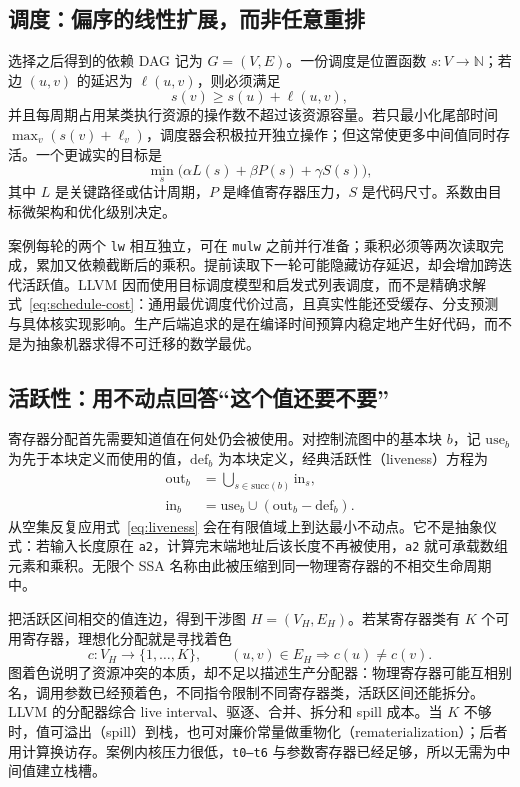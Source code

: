 \subsection{调度：偏序的线性扩展，而非任意重排}

选择之后得到的依赖 DAG 记为 $G=(V,E)$。一份调度是位置函数 $s:V\to\mathbb{N}$；若边 $(u,v)$ 的延迟为 $\ell(u,v)$，则必须满足
\begin{equation}
  s(v)\ge s(u)+\ell(u,v),
  \label{eq:schedule-dep}
\end{equation}
并且每周期占用某类执行资源的操作数不超过该资源容量。若只最小化尾部时间 $\max_v(s(v)+\ell_v)$，调度器会积极拉开独立操作；但这常使更多中间值同时存活。一个更诚实的目标是
\begin{equation}
  \min_s\bigl(\alpha L(s)+\beta P(s)+\gamma S(s)\bigr),
  \label{eq:schedule-cost}
\end{equation}
其中 $L$ 是关键路径或估计周期，$P$ 是峰值寄存器压力，$S$ 是代码尺寸。系数由目标微架构和优化级别决定。

案例每轮的两个 \texttt{lw} 相互独立，可在 \texttt{mulw} 之前并行准备；乘积必须等两次读取完成，累加又依赖截断后的乘积。提前读取下一轮可能隐藏访存延迟，却会增加跨迭代活跃值。LLVM 因而使用目标调度模型和启发式列表调度，而不是精确求解式~\ref{eq:schedule-cost}：通用最优调度代价过高，且真实性能还受缓存、分支预测与具体核实现影响。生产后端追求的是在编译时间预算内稳定地产生好代码，而不是为抽象机器求得不可迁移的数学最优。

\subsection{活跃性：用不动点回答“这个值还要不要”}

寄存器分配首先需要知道值在何处仍会被使用。对控制流图中的基本块 $b$，记 $\mathrm{use}_b$ 为先于本块定义而使用的值，$\mathrm{def}_b$ 为本块定义，经典活跃性（liveness）方程为
\begin{align}
  \mathrm{out}_b &= \bigcup_{s\in\mathrm{succ}(b)}\mathrm{in}_s,\\
  \mathrm{in}_b &= \mathrm{use}_b\cup(\mathrm{out}_b-\mathrm{def}_b).
  \label{eq:liveness}
\end{align}
从空集反复应用式~\ref{eq:liveness} 会在有限值域上到达最小不动点。它不是抽象仪式：若输入长度原在 \texttt{a2}，计算完末端地址后该长度不再被使用，\texttt{a2} 就可承载数组元素和乘积。无限个 SSA 名称由此被压缩到同一物理寄存器的不相交生命周期中。

把活跃区间相交的值连边，得到干涉图 $H=(V_H,E_H)$。若某寄存器类有 $K$ 个可用寄存器，理想化分配就是寻找着色
\[
  c:V_H\to\{1,\ldots,K\},\qquad
  (u,v)\in E_H\Rightarrow c(u)\ne c(v).
\]
图着色说明了资源冲突的本质\cite{llvm-chaitin1981}，却不足以描述生产分配器：物理寄存器可能互相别名，调用参数已经预着色，不同指令限制不同寄存器类，活跃区间还能拆分。LLVM 的分配器综合 live interval、驱逐、合并、拆分和 spill 成本\cite{llvm-codegen}。当 $K$ 不够时，值可溢出（spill）到栈，也可对廉价常量做重物化（rematerialization）；后者用计算换访存。案例内核压力很低，\texttt{t0--t6} 与参数寄存器已经足够，所以无需为中间值建立栈槽。

